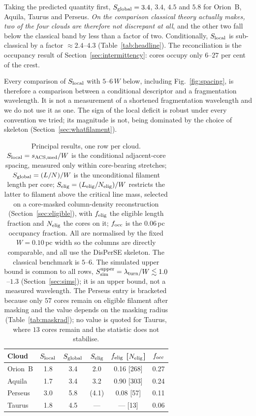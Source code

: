 \documentclass[usenatbib,twoside,twocolumn]{mnras}
\begin{document}
Taking the predicted quantity first, $S_{\rm global}=3.4$, $3.4$, $4.5$ and $5.8$ for Orion~B, Aquila, Taurus and Perseus. \emph{On the comparison classical theory actually makes, two of the four clouds are therefore not discrepant at all}, and the other two fall below the classical band by less than a factor of two. Conditionally, $S_{\rm local}$ is sub-classical by a factor $\approx2.4$--$4.3$ (Table~\ref{tab:headline}). The reconciliation is the occupancy result of Section~\ref{sec:intermittency}: cores occupy only $6$--$27$ per cent of the crest.

Every comparison of $S_{\rm local}$ with $5$--$6\,W$ below, including Fig.~\ref{fig:spacing}, is therefore a comparison between a conditional descriptor and a fragmentation wavelength. It is not a measurement of a shortened fragmentation wavelength and we do not use it as one. The sign of the local deficit is robust under every convention we tried; its magnitude is not, being dominated by the choice of skeleton (Section~\ref{sec:whatfilament}).

\begin{table}
\caption{Principal results, one row per cloud. $S_{\rm local}=s_{\rm ACS,med}/W$ is the conditional adjacent-core spacing, measured only within core-bearing stretches; $S_{\rm global}=(L/N)/W$ is the unconditional filament length per core; $S_{\rm elig}=(L_{\rm elig}/N_{\rm elig})/W$ restricts the latter to filament above the critical line mass, selected on a core-masked column-density reconstruction (Section~\ref{sec:eligible}), with $f_{\rm elig}$ the eligible length fraction and $N_{\rm elig}$ the cores on it; $f_{\rm occ}$ is the $0.06$\,pc occupancy fraction. All are normalised by the fixed $W=0.10$\,pc width so the columns are directly comparable, and all use the DisPerSE skeleton. The classical benchmark is $5$--$6$. The simulated upper bound is common to all rows, $S_{\rm sim}^{\rm upper}=\lambda_{\rm turn}/W\lesssim1.0$--$1.3$ (Section~\ref{sec:sims}); it is an upper bound, not a measured wavelength. The Perseus entry is bracketed because only $57$ cores remain on eligible filament after masking and the value depends on the masking radius (Table~\ref{tab:maskrad}); no value is quoted for Taurus, where $13$ cores remain and the statistic does not stabilise.}
\label{tab:principal}
\footnotesize
\setlength{\tabcolsep}{4pt}
\begin{tabular}{lccccc}
\toprule
Cloud & $S_{\rm local}$ & $S_{\rm global}$ & $S_{\rm elig}$ & $f_{\rm elig}$ [$N_{\rm elig}$] & $f_{\rm occ}$ \\
\midrule
Orion~B & 1.8 & 3.4 & 2.0    & 0.16 [268] & 0.27 \\
Aquila  & 1.7 & 3.4 & 3.2    & 0.90 [303] & 0.24 \\
Perseus & 3.0 & 5.8 & (4.1)  & 0.08 [57]  & 0.11 \\
Taurus  & 1.8 & 4.5 & ---    & --- [13]   & 0.06 \\
\bottomrule
\end{tabular}
\end{table}
\end{document}
